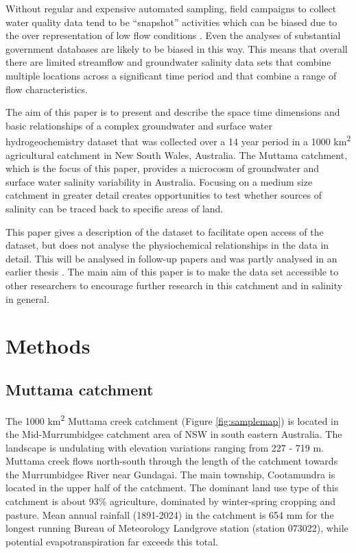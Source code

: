 \documentclass[, manuscript]{copernicus}
\begin{document}
Without regular and expensive automated sampling, field campaigns to
collect water quality data tend to be ``snapshot'' activities
\citep{Grayson1997, Breuer2015, Lyon2008, Cartwright2010, Lintern2018}
which can be biased due to the over representation of low flow
conditions \citep{Lessels2020}. Even the analyses of substantial
government databases \citep{Lintern2018} are likely to be biased in this
way. This means that overall there are limited streamflow and
groundwater salinity data sets that combine multiple locations across a
significant time period and that combine a range of flow
characteristics.

The aim of this paper is to present and describe the space time
dimensions and basic relationships of a complex groundwater and surface
water hydrogeochemistry dataset that was collected over a 14 year period
in a 1000 km\textsuperscript{2} agricultural catchment in New South
Wales, Australia. The Muttama catchment, which is the focus of this
paper, provides a microcosm of groundwater and surface water salinity
variability in Australia. Focusing on a medium size catchment in greater
detail creates opportunities to test whether sources of salinity can be
traced back to specific areas of land.

This paper gives a description of the dataset to facilitate open access
of the dataset, but does not analyse the physiochemical relationships in
the data in detail. This will be analysed in follow-up papers and was
partly analysed in an earlier thesis \citep{Akter2018}. The main aim of
this paper is to make the data set accessible to other researchers to
encourage further research in this catchment and in salinity in general.

\section{Methods}

\subsection{Muttama catchment}

The 1000 km\textsuperscript{2} Muttama creek catchment (Figure
\ref{fig:samplemap}) is located in the Mid-Murrumbidgee catchment area
of NSW in south eastern Australia. The landscape is undulating with
elevation variations ranging from 227 - 719 m. Muttama creek flows
north-south through the length of the catchment towards the Murrumbidgee
River near Gundagai. The main township, Cootamundra is located in the
upper half of the catchment. The dominant land use type of this
catchment is about 93\% agriculture, dominated by winter-spring cropping
and pasture. Mean annual rainfall (1891-2024) in the catchment is 654 mm
for the longest running Bureau of Meteorology Landgrove station (station
073022), while potential evapotranspiration far exceeds this total.
\end{document}
